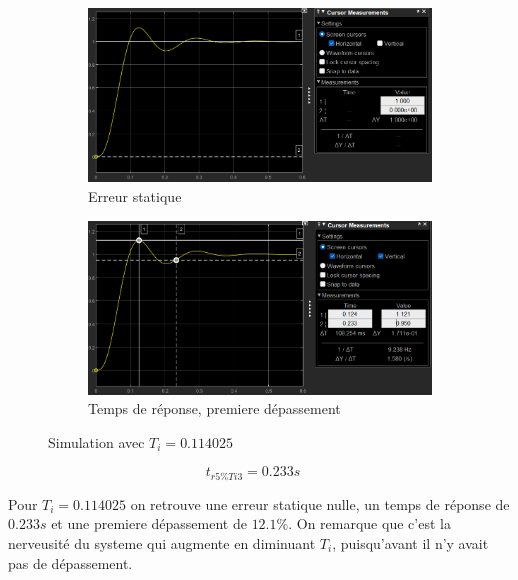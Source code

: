 \documentclass[12pt, a4paper]{report}
\begin{document}
\begin{figure}[H]
    \begin{subfigure}[h!]{0.4\linewidth}
        \includegraphics[width=\linewidth]{sim2ti3errur.png}
        \caption{Erreur statique}
    \end{subfigure}
    \hfill    
    \begin{subfigure}[h!]{0.4\linewidth}
        \includegraphics[width=\linewidth]{sim2ti3deptr.png}
        \caption{Temps de réponse, premiere dépassement}
    \end{subfigure}
    \caption{Simulation avec $T_i = 0.114025$}
    \label{fig:sim2KTi3}
\end{figure}

\[
    t_{r5\%Ti3} = 0.233s \quad
\]

Pour $T_i = 0.114025$ on retrouve une erreur statique nulle, un temps de réponse de $0.233s$ et une premiere dépassement de
$12.1\%$. On remarque que c'est la nerveusité du systeme qui augmente en diminuant $T_i$, puisqu'avant il n'y avait pas de dépassement.
\end{document}
